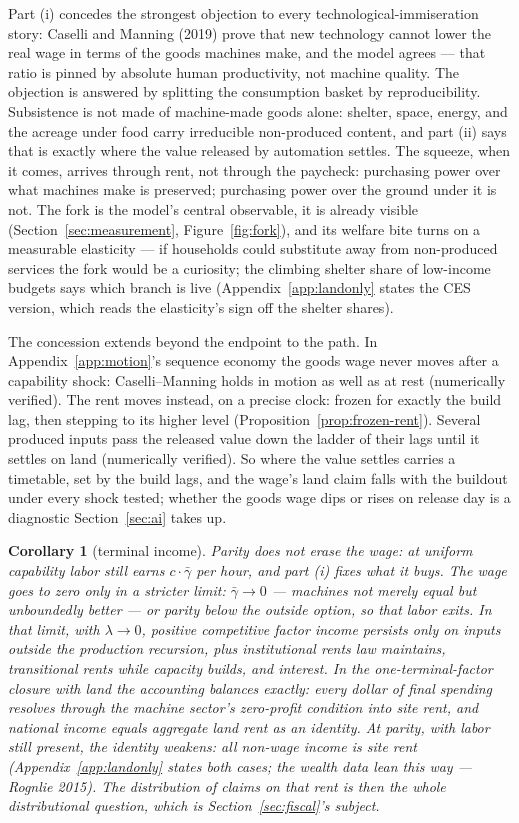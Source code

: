 \documentclass[12pt]{article}
\theoremstyle{plain}
\newtheorem*{corollary}{Corollary}
\begin{document}
Part (i) concedes the strongest objection to every technological-immiseration story: Caselli and Manning (2019) prove that new technology cannot lower the real wage in terms of the goods machines make, and the model agrees --- that ratio is pinned by absolute human productivity, not machine quality. The objection is answered by splitting the consumption basket by reproducibility. Subsistence is not made of machine-made goods alone: shelter, space, energy, and the acreage under food carry irreducible non-produced content, and part (ii) says that is exactly where the value released by automation settles. The squeeze, when it comes, arrives through rent, not through the paycheck: purchasing power over what machines make is preserved; purchasing power over the ground under it is not. The fork is the model's central observable, it is already visible (Section~\ref{sec:measurement}, Figure~\ref{fig:fork}), and its welfare bite turns on a measurable elasticity --- if households could substitute away from non-produced services the fork would be a curiosity; the climbing shelter share of low-income budgets says which branch is live (Appendix~\ref{app:landonly} states the CES version, which reads the elasticity's sign off the shelter shares).

The concession extends beyond the endpoint to the path. In Appendix~\ref{app:motion}'s sequence economy the goods wage never moves after a capability shock: Caselli--Manning holds in motion as well as at rest (numerically verified). The rent moves instead, on a precise clock: frozen for exactly the build lag, then stepping to its higher level (Proposition~\ref{prop:frozen-rent}). Several produced inputs pass the released value down the ladder of their lags until it settles on land (numerically verified). So where the value settles carries a timetable, set by the build lags, and the wage's land claim falls with the buildout under every shock tested; whether the goods wage dips or rises on release day is a diagnostic Section~\ref{sec:ai} takes up.

\begin{corollary}[terminal income]
Parity does not erase the wage: at uniform capability labor still earns $c\cdot \bar{\gamma}$ per hour, and part (i) fixes what it buys. The wage goes to zero only in a stricter limit: $\bar{\gamma} \to 0$ --- machines not merely equal but unboundedly better --- or parity below the outside option, so that labor exits. In that limit, with $\lambda \to 0$, positive competitive factor income persists only on inputs outside the production recursion, plus institutional rents law maintains, transitional rents while capacity builds, and interest. In the one-terminal-factor closure with land the accounting balances exactly: every dollar of final spending resolves through the machine sector's zero-profit condition into site rent, and national income equals aggregate land rent as an identity. At parity, with labor still present, the identity weakens: all non-wage income is site rent (Appendix~\ref{app:landonly} states both cases; the wealth data lean this way --- Rognlie 2015). The distribution of claims on that rent is then the whole distributional question, which is Section~\ref{sec:fiscal}'s subject.
\end{corollary}
\end{document}

